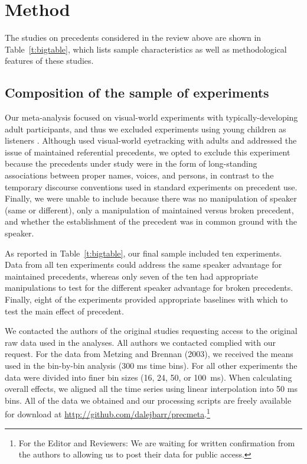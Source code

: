 \documentclass[doc,fignum,apacite,floatsintext]{apa6}
\begin{document}
\section{Method}

The studies on precedents considered in the review above are shown in Table~\ref{t:bigtable}, which lists sample characteristics as well as methodological features of these studies.

\subsection{Composition of the sample of experiments}

Our meta-analysis focused on visual-world experiments with typically-developing adult participants, and thus we excluded experiments using young children as listeners \cite{GrahamSedivyKhu2014,MatthewsLievenTomasello2012}.  Although  used visual-world eyetracking with adults and addressed the issue of maintained referential precedents, we opted to exclude this experiment because the precedents under study were in the form of long-standing associations between proper names, voices, and persons, in contrast to the temporary discourse conventions used in standard experiments on precedent use.  Finally, we were unable to include  because there was no manipulation of speaker (same or different), only a manipulation of maintained versus broken precedent, and whether the establishment of the precedent was in common ground with the speaker.

As reported in Table~\ref{t:bigtable}, our final sample included ten experiments.  Data from all ten experiments could address the same speaker advantage for maintained precedents, whereas only seven of the ten had appropriate manipulations to test for the different speaker advantage for broken precedents.  Finally, eight of the experiments provided appropriate baselines with which to test the main effect of precedent.

We contacted the authors of the original studies requesting access to the original raw data used in the analyses.  All authors we contacted complied with our request.  For the data from Metzing and Brennan (2003), we received the means used in the bin-by-bin analysis (300 ms time bins).  For all other experiments the data were divided into finer bin sizes (16, 24, 50, or 100~ms).  When calculating overall effects, we aligned all the time series using linear interpolation into 50 ms bins.  All of the data we obtained and our processing scripts are freely available for download at \url{http://github.com/dalejbarr/precmeta}.\footnote{For the Editor and Reviewers: We are waiting for written confirmation from the authors to allowing us to post their data for public access.}
\end{document}
